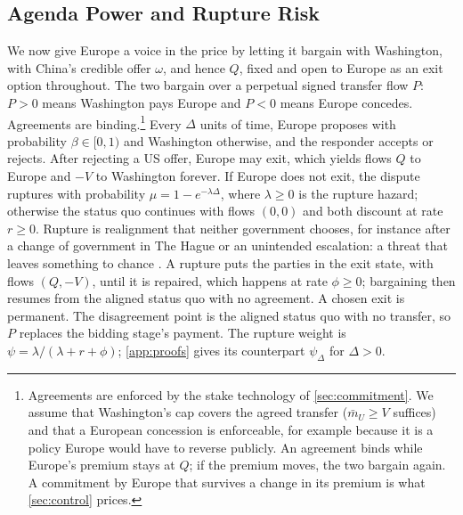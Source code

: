 \subsection{Agenda Power and Rupture Risk}\label{sec:master}

We now give Europe a voice in the price by letting it bargain with Washington, with China's credible offer $\omega$, and hence $Q$, fixed and open to Europe as an exit option throughout. The two bargain over a perpetual signed transfer flow $P$: $P>0$ means Washington pays Europe and $P<0$ means Europe concedes. Agreements are binding.\footnote{Agreements are enforced by the stake technology of \cref{sec:commitment}. We assume that Washington's cap covers the agreed transfer ($\bar m_U\ge V$ suffices) and that a European concession is enforceable, for example because it is a policy Europe would have to reverse publicly. An agreement binds while Europe's premium stays at $Q$; if the premium moves, the two bargain again. A commitment by Europe that survives a change in its premium is what \cref{sec:control} prices.} Every $\Delta$ units of time, Europe proposes with probability $\beta\in[0,1)$ and Washington otherwise, and the responder accepts or rejects. After rejecting a US offer, Europe may exit, which yields flows $Q$ to Europe and $-V$ to Washington forever. If Europe does not exit, the dispute ruptures with probability $\mu=1-e^{-\lambda\Delta}$, where $\lambda\ge 0$ is the rupture hazard; otherwise the status quo continues with flows $(0,0)$ and both discount at rate $r\ge 0$. Rupture is realignment that neither government chooses, for instance after a change of government in The Hague or an unintended escalation: a threat that leaves something to chance \citep{schelling1960strategy}. A rupture puts the parties in the exit state, with flows $(Q,-V)$, until it is repaired, which happens at rate $\phi\ge 0$; bargaining then resumes from the aligned status quo with no agreement. A chosen exit is permanent. The disagreement point is the aligned status quo with no transfer, so $P$ replaces the bidding stage's payment. The rupture weight is $\psi=\lambda/(\lambda+r+\phi)$; \cref{app:proofs} gives its counterpart $\psi_\Delta$ for $\Delta>0$.

